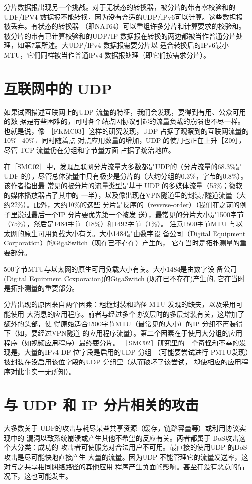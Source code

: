 分片数据报出现另一个挑战。对于无状态的转换器，被分片的带有零校验和的 UDP/IPV4
数据报不能转换，因为没有合适的UDP/IPv6可以计算。这些数据报被丢弃。有状态的转换器
（即NAT64）可以重组许多分片和计算要求的校验和。被分片的带有已计算校验和的UDP/IP
数据报在转换的两边都被当作普通分片处理，如第7章所述。大UDP/IPv4 数据报需要分片以
适合转换后的IPv6最小MTU，它们同样被当作普通IPv4 数据报处理（即它们按需求分片）。

\section{互联网中的 UDP}
如果试图描述互联网上的UDP 流量的特征，我们会发现，要得到有用、公众可用的数
据是有些困难的，同时各个站点因协议引起的流量负载的崩溃也不尽一样。也就是说，像
［FKMC03］这样的研究发现，UDP 占据了观察到的互联网流量的10\% ~40\%，同时随着点
对点应用数量的增加，UDP 的使用也正在上升［Z09］，尽管 TCP 流量仍在分组和字节量方面
占据了统治地位。

在［SMC02］中，发现互联网分片流量大多数都是UDP的（分片流量的68.3\%是UDP
的），尽管总体流量中只有极少是分片的（大约分组的0.3\%，字节的0.8\%）。该作者指出最
常见的被分片的流量类型是基于 UDP 的多媒体流量（55\%；微软的媒体播放器占了其中的
一半），以及像出现在VPN隧道里的封装/隧道流量（大约22\%）。此外，大约10\%的这些
分片是反序的（reverse-order）（我们在之前的例子里说过最后一个IP 分片要优先第一个被发
送），最常见的分片大小是1500字节（75\%），然后是1484字节（18\%）和1492字节（1\%）。
注意1500字节MTU 与以太网的原生可用负载大小有关。大小1484是由数字设
备公司（Digital Equipment Corporation）的GigaSwitch（现在已不存在）产生的，
它在当时是拓扑测量的重要部分。

\begin{tcolorbox}
    500字节MTU与以太网的原生可用负载大小有关。大小1484是由数字设
    备公司(Digital Equipment Coxporation)的GigaSwitch (现在已不存在)产生的,
    它在当时是拓扑测量的重要部分。
\end{tcolorbox}

分片出现的原因来自两个因素：粗糙封装和路径 MTU 发现的缺失，以及采用可能使用
大消息的应用程序。前者与经过多个协议层时的多层封装有关，这增加了额外的头部，使
得原始适合1500字节MTU（最常见的大小）的IP 分组不再装得下（如，要经过VPN隧道
的应用程序流量）。第二个因素在于使用大分组的应用程序（如视频应用程序）最终要分片。
［SMC02］研究里的一个奇怪和不幸的发现是，大量的IPv4 DF 位字段是启用的UDP 分组
（可能要尝试进行 PMTU发现）被封装在没启用该位字段的UDP 分组里（从而破坏了该尝试，
却使相应的应用程序对此事实一无所知）。

\section{与 UDP 和 IP 分片相关的攻击}
大多数关于 UDP的攻击与耗尽某些共享资源（缓存，链路容量等）或利用协议实现中的
漏洞以致系统崩溃或产生其他不希望的反应有关。两者都属于 DoS攻击这个大分类：成功的
攻击者可使服务对合法用户不可用。最直接的使用UDP 的DoS攻击是尽可能快地直接产生
大量的流量。因为UDP 不能管理它的流量发送率，这对与之共享相同网络路径的其他应用
程序产生负面的影响。甚至在没有恶意的情况下，这也可能发生。

